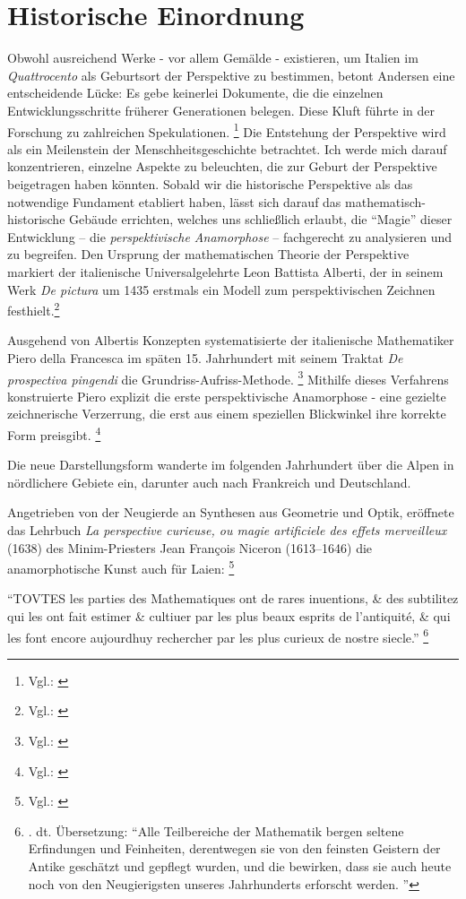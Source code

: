 \section{Historische Einordnung}

Obwohl ausreichend Werke - vor allem Gemälde - existieren, um Italien im \textit{Quattrocento} als Geburtsort der Perspektive zu bestimmen, betont Andersen eine entscheidende Lücke: Es gebe keinerlei Dokumente, die die einzelnen Entwicklungsschritte früherer Generationen belegen. Diese Kluft führte in der Forschung zu zahlreichen Spekulationen. \footnote{Vgl.: \cite[S. 2]{Andersen2007}}
Die Entstehung der Perspektive wird als ein Meilenstein der Menschheitsgeschichte betrachtet. Ich werde mich darauf konzentrieren, einzelne Aspekte zu beleuchten, die zur Geburt der Perspektive beigetragen haben könnten. Sobald wir die historische Perspektive als das notwendige Fundament etabliert haben, lässt sich darauf das mathematisch-historische Gebäude errichten, welches uns schließlich erlaubt, die "`Magie"' dieser Entwicklung -- die \textit{perspektivische Anamorphose} -- fachgerecht zu analysieren und zu begreifen.
Den Ursprung der mathematischen Theorie der Perspektive markiert der italienische Universalgelehrte Leon Battista Alberti, der in seinem Werk \textit{De pictura} um 1435 erstmals ein Modell zum perspektivischen Zeichnen festhielt.\footnote{Vgl.: \cite[S. 1]{Andersen2007}}

Ausgehend von Albertis Konzepten systematisierte der italienische Mathematiker Piero della Francesca im späten 15. Jahrhundert mit seinem Traktat \textit{De prospectiva pingendi} die Grundriss-Aufriss-Methode. \footnote{Vgl.: \cite[S. 14]{Andersen2007}} Mithilfe dieses Verfahrens konstruierte Piero explizit die erste perspektivische Anamorphose - eine gezielte zeichnerische Verzerrung, die erst aus einem speziellen Blickwinkel ihre korrekte Form preisgibt. \footnote{Vgl.: \cite[S. 71-73]{Andersen2007}}

Die neue Darstellungsform wanderte im folgenden Jahrhundert über die Alpen in nördlichere Gebiete ein, darunter auch nach Frankreich und Deutschland.

Angetrieben von der Neugierde an Synthesen aus Geometrie und Optik, eröffnete das  Lehrbuch  \textit{La perspective curieuse, ou magie artificiele des effets merveilleux} (1638) des Minim-Priesters Jean François Niceron (1613–1646) die anamorphotische Kunst auch für Laien: \footnote{Vgl.: \cite[S. 452]{Andersen2007}}

\enquote{TOVTES les parties des Mathematiques ont de rares inuentions, \& des subtilitez qui les ont fait estimer \& cultiuer par les plus beaux esprits de l'antiquité, \& qui les font encore aujourdhuy rechercher par les plus curieux de nostre siecle.} \footnote{\cite[S. 1]{Niceron1663}. dt. Übersetzung: "`Alle Teilbereiche der Mathematik bergen seltene Erfindungen und Feinheiten, derentwegen sie von den feinsten Geistern der Antike geschätzt und gepflegt wurden, und die bewirken, dass sie auch heute noch von den Neugierigsten unseres Jahrhunderts erforscht werden. "'}